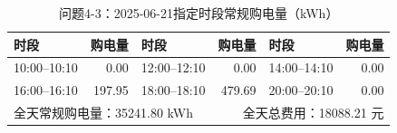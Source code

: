 \begin{table}[H]\centering\small
\caption{问题4-3：2025-06-21指定时段常规购电量（kWh）}
\label{tab:q4_3_0621_purchase}
\begin{tabular}{lrlrlr}\toprule
时段 & 购电量 & 时段 & 购电量 & 时段 & 购电量 \\\midrule
10:00--10:10 & 0.00 & 12:00--12:10 & 0.00 & 14:00--14:10 & 0.00 \\
16:00--16:10 & 197.95 & 18:00--18:10 & 479.69 & 20:00--20:10 & 0.00 \\
\midrule
\multicolumn{3}{l}{全天常规购电量：35241.80 kWh} & \multicolumn{3}{r}{全天总费用：18088.21 元}\\
\bottomrule\end{tabular}\end{table}
